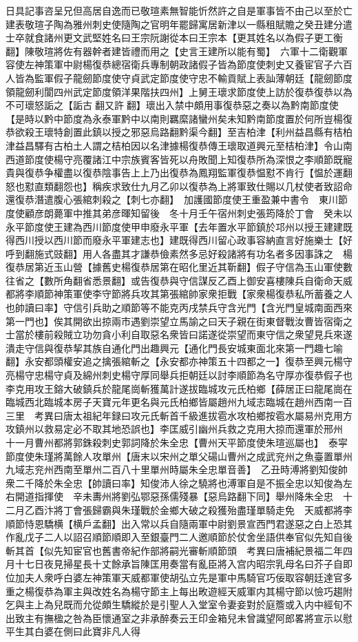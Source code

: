 日具記事咨呈兄但高居自逸而已敬瑄素無智能忻然許之自是軍事皆不由己以至於亡建表敬瑄子陶為雅州刺史使隨陶之官明年罷歸寓居新津以一縣租賦贍之癸丑建分遣士卒就食諸州更文武堅姓名曰王宗阮謝從本曰王宗本【更其姓名以為假子更工衡翻】陳敬瑄將佐有器幹者建皆禮而用之【史言王建所以能有蜀】　六軍十二衛觀軍容使左神策軍中尉楊復恭總宿衛兵專制朝政諸假子皆為節度使刺史又養宦官子六百人皆為監軍假子龍劒節度使守貞武定節度使守忠不輸貢賦上表訕薄朝廷【龍劒節度領龍劒利閬四州武定節度領洋果階扶四州】上舅王瓌求節度使上訪於復恭復恭以為不可瓌怒詬之【詬古翻又許翻】瓌出入禁中頗用事復恭惡之奏以為黔南節度使【是時以黔中節度為永泰軍黔中以南則羈縻諸蠻州矣未知黔南節度置於何所豈楊復恭欲殺王瓌特創置此鎮以授之邪惡烏路翻黔渠今翻】至吉柏津【利州益昌縣有桔柏津益昌驛有古柏土人謂之桔柏因以名津據楊復恭傳王瓌取道興元至桔柏津】令山南西道節度使楊守亮覆諸江中宗族賓客皆死以舟敗聞上知復恭所為深恨之李順節既寵貴與復恭争權盡以復恭陰事告上上乃出復恭為鳳翔監軍復恭愠懟不肯行【愠於運翻怒也懟直類翻怨也】稱疾求致仕九月乙卯以復恭為上將軍致仕賜以几杖使者致詔命還復恭潛遣腹心張綰刺殺之【刺七亦翻】　加護國節度使王重盈兼中書令　東川節度使顧彦朗薨軍中推其弟彦暉知留後　冬十月壬午宿州刺史張筠降於丁會　癸未以永平節度使王建為西川節度使甲申廢永平軍【去年置水平節鎮於邛州以授王建建既得西川授以西川節而廢永平軍建志也】建既得西川留心政事容納直言好施樂士【好呼到翻施式豉翻】用人各盡其才謙恭儉素然多忌好殺諸將有功名者多因事誅之　楊復恭居第近玉山營【據舊史楊復恭居第在昭化里近其靳翻】假子守信為玉山軍使數往省之【數所角翻省悉景翻】或告復恭與守信謀反乙酉上御安喜樓陳兵自衛命天威都將李順節神策軍使李守節將兵攻其第張綰帥家衆拒戰【家衆楊復恭私所蓄養之人也帥讀曰率】守信引兵助之順節等不能克丙戌禁兵守含光門【含光門皇城南面西來第一門也】俟其開欲出掠兩市遇劉崇望立馬諭之曰天子親在街東督戰汝曹皆宿衛之士當於樓前殺賊立功勿貪小利自取惡名衆皆曰諾遂從崇望而東守信之衆望見兵來遂潰走守信與復恭挈其族自通化門出趣興元【通化門長安城東面北來第一門趣七喻翻】永安都頭權安追之擒張綰斬之【永安都亦神策五十四都之一】復恭至興元楊守亮楊守忠楊守貞及綿州刺史楊守厚同舉兵拒朝廷以討李順節為名守厚亦復恭假子也　李克用攻王鎔大破鎮兵於龍尾崗斬獲萬計遂拔臨城攻元氏柏鄉【薛居正曰龍尾崗在臨城西北臨城本房子天寶元年更名與元氏柏鄉皆屬趙州九域志臨城在趙州西南一百三里　考異曰唐太祖紀年録曰攻元氏斬首千級進拔雹水攻柏鄉按雹水屬易州克用方攻鎮州以救易定必不取其地恐誤也】李匡威引幽州兵救之克用大掠而還軍於邢州　十一月曹州都將郭銖殺刺史郭詞降於朱全忠【曹州天平節度使朱瑄巡屬也】　泰寜節度使朱瑾將萬餘人攻單州【唐末以宋州之單父碭山曹州之成武兖州之魚臺置單州九域志兖州西南至單州二百八十里單州時屬朱全忠單音善】　乙丑時溥將劉知俊帥衆二千降於朱全忠【帥讀曰率】知俊沛人徐之驍將也溥軍自是不振全忠以知俊為左右開道指揮使　辛未夀州將劉弘鄂惡孫儒殘暴【惡烏路翻下同】舉州降朱全忠　十二月乙酉汴將丁會張歸霸與朱瑾戰於金鄉大破之殺獲殆盡瑾單騎走免　天威都將李順節恃恩驕横【横戶孟翻】出入常以兵自隨兩軍中尉劉景宣西門君遂惡之白上恐其作亂戊子二人以詔召順節順即入至銀臺門二人邀順節於仗舍坐語供奉官似先知自後斬其首【似先知宦官也舊書帝紀作部將嗣光審斬順節頭　考異曰唐補紀景福二年四月十七日夜見掃星長十丈餘承旨陳匡用奏當有亂臣將入宫内昭宗乳母名曰芥子自即位加夫人衆呼白婆左神策軍天威都軍使胡弘立先是軍中馬騎官巧佞取容朝廷達官多重之楊復恭為軍主與改姓名為楊守節主上每出畋遊經天威軍内其楊守節以憸巧趨附乞與主上為兒既而允從頗生驕縱於是引聖人入堂室令妻妾對於庭簷或入内中經旬不出致主有撫楹之咎為臣懷通室之非承醉奏云王印金箱兒未曾識望阿郎畧將宣示以慰平生其白婆在側曰此寶非凡人得